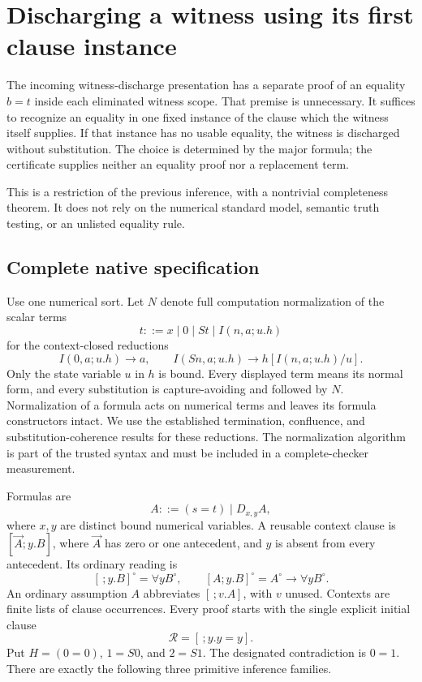 
\section{Discharging a witness using its first clause instance}
\label{sec:deterministic-name}

The incoming witness-discharge presentation has a separate proof of an
equality $b=t$ inside each eliminated witness scope. That premise is
unnecessary. It suffices to recognize an equality in one fixed instance of
the clause which the witness itself supplies. If that instance has no usable
equality, the witness is discharged without substitution. The choice is
determined by the major formula; the certificate supplies neither an
equality proof nor a replacement term.

This is a restriction of the previous inference, with a nontrivial
completeness theorem. It does not rely on the numerical standard model,
semantic truth testing, or an unlisted equality rule.

\subsection{Complete native specification}

Use one numerical sort. Let $N$ denote full computation normalization of
the scalar terms
\[
 t ::= x\mid 0\mid St\mid I(n,a;u.h)
\]
for the context-closed reductions
\[
 I(0,a;u.h)\longrightarrow a,
 \qquad I(Sn,a;u.h)\longrightarrow h[I(n,a;u.h)/u].
 \tag{NF}
\]
Only the state variable $u$ in $h$ is bound. Every displayed term means
its normal form, and every substitution is capture-avoiding and followed
by $N$. Normalization of a formula acts on numerical terms and leaves its
formula constructors intact. We use the established termination,
confluence, and substitution-coherence results for these reductions.
The normalization algorithm is part of the trusted syntax and must be
included in a complete-checker measurement.

Formulas are
\[
 A ::= (s=t)\mid D_{x,y}A,
\]
where $x,y$ are distinct bound numerical variables. A reusable context
clause is $[\vec A;y.B]$, where $\vec A$ has zero or one antecedent,
and $y$ is absent from every antecedent. Its ordinary reading is
\[
 [\,;y.B]^\circ=\forall y B^\circ,
 \qquad [A;y.B]^\circ=A^\circ\to\forall y B^\circ.
\]
An ordinary assumption $A$ abbreviates $[\,;v.A]$, with $v$ unused.
Contexts are finite lists of clause occurrences. Every proof starts with
the single explicit initial clause
\[
                 \mathcal R=[\,;y.y=y]. \tag{Ax}
\]
Put $H=(0=0)$, $1=S0$, and $2=S1$. The designated contradiction is $0=1$.
There are exactly the following three primitive inference families.

